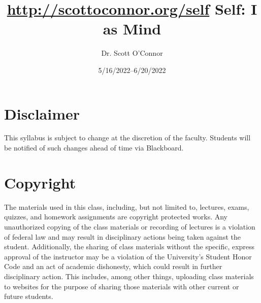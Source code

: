 \documentclass[article,oneside]{memoir}
\def\myauthor{Author}
\def\mytitle{Title}
\def\mycopyright{\myauthor}
\def\myweb{\href{http://scottoconnor.org/self}{http://scottoconnor.org/self}}
\def\myauthor{Dr. Scott O'Connor}
\def\mytitle{{\normalsize \myweb \newline} \HUGE Self: I as Mind}
\begin{document}
\setsansfont[Mapping=tex-text]{Myriad Pro} 
\setmonofont[Mapping=tex-text,Scale=0.8]{Georgia} 

\def\ind{\hangindent=1 true cm\hangafter=1 \noindent}
\def\labelitemi{$\cdot$}


\title{\LARGE \mytitle}     
\author{\Large\myauthor %
}
\date{5/16/2022--6/20/2022}



\maketitle




%
%


\section{Disclaimer}
 This syllabus is subject to change at the discretion of the faculty. Students will be notified of such changes ahead of time via Blackboard. 


\section{Copyright}
The materials used in this class, including, but not limited to, lectures, exams, quizzes, and homework assignments are copyright protected works.  Any unauthorized copying of the class materials or recording of lectures is a violation of federal law and may result in disciplinary actions being taken against the student.  Additionally, the sharing of class materials without the specific, express approval of the instructor may be a violation of the University's Student Honor Code and an act of academic dishonesty, which could result in further disciplinary action.  This includes, among other things, uploading class materials to websites for the purpose of sharing those materials with other current or future students. 
\end{document}

